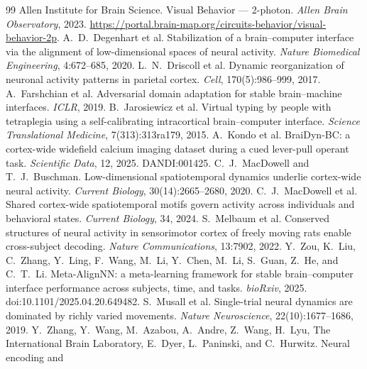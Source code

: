 \documentclass{article}
\begin{document}
{\small

\begin{thebibliography}{99}
 Allen Institute for Brain Science.
Visual Behavior --- 2-photon. \emph{Allen Brain Observatory}, 2023.
\url{https://portal.brain-map.org/circuits-behavior/visual-behavior-2p}.
 A.~D.~Degenhart et al. Stabilization of a
brain--computer interface via the alignment of low-dimensional spaces of neural activity.
\emph{Nature Biomedical Engineering}, 4:672--685, 2020.
 L.~N.~Driscoll et al. Dynamic reorganization of
neuronal activity patterns in parietal cortex. \emph{Cell}, 170(5):986--999, 2017.
 A.~Farshchian et al. Adversarial domain
adaptation for stable brain--machine interfaces. \emph{ICLR}, 2019.
 B.~Jarosiewicz et al. Virtual typing by people
with tetraplegia using a self-calibrating intracortical brain--computer interface. \emph{Science
Translational Medicine}, 7(313):313ra179, 2015.
 A.~Kondo et al. BraiDyn-BC: a cortex-wide widefield calcium
imaging dataset during a cued lever-pull operant task. \emph{Scientific Data}, 12, 2025.
DANDI:001425.
 C.~J.~MacDowell and T.~J.~Buschman.
Low-dimensional spatiotemporal dynamics underlie cortex-wide neural activity. \emph{Current
Biology}, 30(14):2665--2680, 2020.
 C.~J.~MacDowell et al. Shared cortex-wide
spatiotemporal motifs govern activity across individuals and behavioral states. \emph{Current
Biology}, 34, 2024.
 S.~Melbaum et al. Conserved structures of neural
activity in sensorimotor cortex of freely moving rats enable cross-subject decoding. \emph{Nature
Communications}, 13:7902, 2022.
 Y.~Zou, K.~Liu, C.~Zhang, Y.~Ling, F.~Wang, M.~Li,
Y.~Chen, M.~Li, S.~Guan, Z.~He, and C.~T.~Li. Meta-AlignNN: a meta-learning framework for stable
brain--computer interface performance across subjects, time, and tasks. \emph{bioRxiv}, 2025.
doi:10.1101/2025.04.20.649482.
 S.~Musall et al. Single-trial neural dynamics are
dominated by richly varied movements. \emph{Nature Neuroscience}, 22(10):1677--1686, 2019.
 Y.~Zhang, Y.~Wang, M.~Azabou, A.~Andre, Z.~Wang, H.~Lyu,
The International Brain Laboratory, E.~Dyer, L.~Paninski, and C.~Hurwitz. Neural encoding and

\end{thebibliography}}
\end{document}
